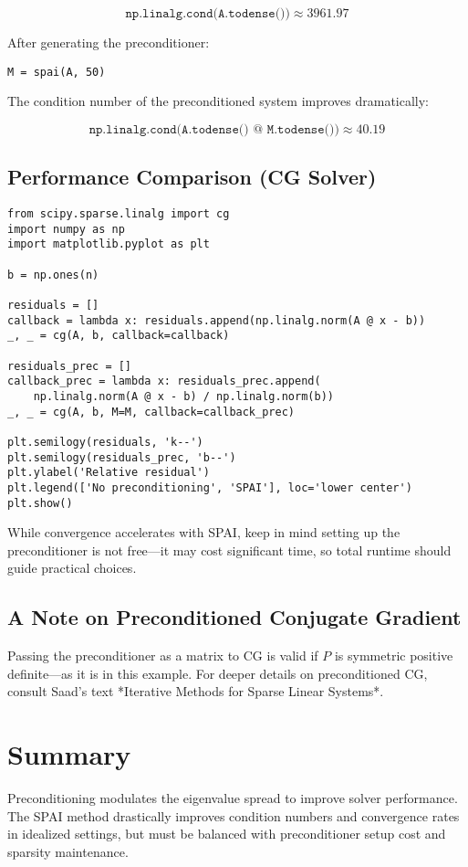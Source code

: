 \documentclass[11pt,a4paper]{book}
\begin{document}
\[
\texttt{np.linalg.cond(A.todense())}
\approx 3961.97
\]

After generating the preconditioner:

\begin{lstlisting}
M = spai(A, 50)
\end{lstlisting}

The condition number of the preconditioned system improves dramatically:

\[
\texttt{np.linalg.cond(A.todense() @ M.todense())}
\approx 40.19
\]

\subsection*{Performance Comparison (CG Solver)}
\begin{lstlisting}
from scipy.sparse.linalg import cg
import numpy as np
import matplotlib.pyplot as plt

b = np.ones(n)

residuals = []
callback = lambda x: residuals.append(np.linalg.norm(A @ x - b))
_, _ = cg(A, b, callback=callback)

residuals_prec = []
callback_prec = lambda x: residuals_prec.append(
    np.linalg.norm(A @ x - b) / np.linalg.norm(b))
_, _ = cg(A, b, M=M, callback=callback_prec)

plt.semilogy(residuals, 'k--')
plt.semilogy(residuals_prec, 'b--')
plt.ylabel('Relative residual')
plt.legend(['No preconditioning', 'SPAI'], loc='lower center')
plt.show()
\end{lstlisting}

While convergence accelerates with SPAI, keep in mind setting up the preconditioner is not free—it may cost significant time, so total runtime should guide practical choices.

\subsection*{A Note on Preconditioned Conjugate Gradient}
Passing the preconditioner as a matrix to CG is valid if \(P\) is symmetric positive definite—as it is in this example. For deeper details on preconditioned CG, consult Saad’s text *Iterative Methods for Sparse Linear Systems*.

\section*{Summary}
Preconditioning modulates the eigenvalue spread to improve solver performance. The SPAI method drastically improves condition numbers and convergence rates in idealized settings, but must be balanced with preconditioner setup cost and sparsity maintenance.
\end{document}
